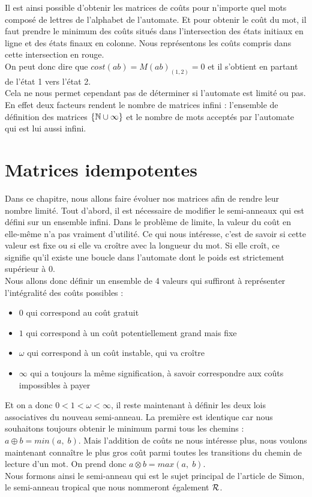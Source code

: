 \documentclass{report}
\begin{document}
Il est ainsi possible d'obtenir les matrices de coûts pour n'importe quel mots composé de lettres de l'alphabet de l'automate. Et pour obtenir le coût du mot, il faut prendre le minimum des coûts situés dans l'intersection des états initiaux en ligne et des états finaux en colonne. Nous représentons les coûts compris dans cette intersection en rouge.\\
On peut donc dire que $cost(ab) = M(ab)_{(1,2)} = 0$ et il s'obtient en partant de l'état 1 vers l'état 2.\\

Cela ne nous permet cependant pas de déterminer si l'automate est limité ou pas. En effet deux facteurs rendent le nombre de matrices infini : l'ensemble de définition des matrices $\{\mathbb{N} \cup \infty\}$ et le nombre de mots acceptés par l'automate qui est lui aussi infini.
\chapter{Matrices idempotentes}

Dans ce chapitre, nous allons faire évoluer nos matrices afin de rendre leur nombre limité. Tout d'abord, il est nécessaire de modifier le semi-anneaux qui est défini sur un ensemble infini. Dans le problème de limite, la valeur du coût en elle-même n'a pas vraiment d'utilité. Ce qui nous intéresse, c'est de savoir si cette valeur est fixe ou si elle va croître avec la longueur du mot. Si elle croît, ce signifie qu'il existe une boucle dans l'automate dont le poids est strictement supérieur à 0.\\
Nous allons donc définir un ensemble de 4 valeurs qui suffiront à représenter l'intégralité des coûts possibles : 
\begin{itemize}
\item $0$ qui correspond au coût gratuit
\item $1$ qui correspond à un coût potentiellement grand mais fixe
\item $\omega$ qui correspond à un coût instable, qui va croître
\item $\infty$ qui a toujours la même signification, à savoir correspondre aux coûts impossibles à payer
\end{itemize}
$\ $\\
Et on a donc $0 < 1 < \omega < \infty$, il reste maintenant à définir les deux lois associatives du nouveau semi-anneau. La première est identique car nous souhaitons toujours obtenir le minimum parmi tous les chemins : $a \oplus b = min(a,\;b)$. Mais l'addition de coûts ne nous intéresse plus, nous voulons maintenant connaître le plus gros coût parmi toutes les transitions du chemin de lecture d'un mot. On prend donc $a \otimes b = max(a,\;b)$.\\
Nous formons ainsi le semi-anneau qui est le sujet principal de l'article de Simon, le semi-anneau tropical que nous nommeront également $\mathcal{R}$.\\
\end{document}
